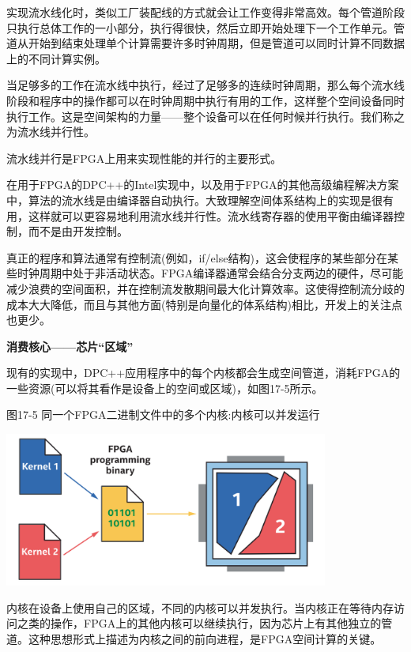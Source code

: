 实现流水线化时，类似工厂装配线的方式就会让工作变得非常高效。每个管道阶段只执行总体工作的一小部分，执行得很快，然后立即开始处理下一个工作单元。管道从开始到结束处理单个计算需要许多时钟周期，但是管道可以同时计算不同数据上的不同计算实例。\par

当足够多的工作在流水线中执行，经过了足够多的连续时钟周期，那么每个流水线阶段和程序中的操作都可以在时钟周期中执行有用的工作，这样整个空间设备同时执行工作。这是空间架构的力量——整个设备可以在任何时候并行执行。我们称之为流水线并行性。\par

\begin{tcolorbox}[colback=red!5!white,colframe=red!75!black]
流水线并行是FPGA上用来实现性能的并行的主要形式。
\end{tcolorbox}

\begin{tcolorbox}[colback=blue!5!white,colframe=blue!75!black, title=自动型流水线]
在用于FPGA的DPC++的Intel实现中，以及用于FPGA的其他高级编程解决方案中，算法的流水线是由编译器自动执行。大致理解空间体系结构上的实现是很有用，这样就可以更容易地利用流水线并行性。流水线寄存器的使用平衡由编译器控制，而不是由开发控制。
\end{tcolorbox}

真正的程序和算法通常有控制流(例如，if/else结构)，这会使程序的某些部分在某些时钟周期中处于非活动状态。FPGA编译器通常会结合分支两边的硬件，尽可能减少浪费的空间面积，并在控制流发散期间最大化计算效率。这使得控制流分歧的成本大大降低，而且与其他方面(特别是向量化的体系结构)相比，开发上的关注点也更少。\par

\hspace*{\fill} \par %
\textbf{消费核心——芯片“区域”}

现有的实现中，DPC++应用程序中的每个内核都会生成空间管道，消耗FPGA的一些资源(可以将其看作是设备上的空间或区域)，如图17-5所示。\par

\hspace*{\fill} \par %
图17-5 同一个FPGA二进制文件中的多个内核:内核可以并发运行
\begin{center}
	\includegraphics[width=0.8\textwidth]{content/chapter-17/images/6}
\end{center}

内核在设备上使用自己的区域，不同的内核可以并发执行。当内核正在等待内存访问之类的操作，FPGA上的其他内核可以继续执行，因为芯片上有其他独立的管道。这种思想形式上描述为内核之间的前向进程，是FPGA空间计算的关键。\par







